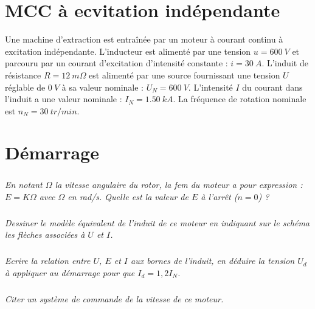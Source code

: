 \documentclass[10pt,fleqn]{article} %
\begin{document}

\vspace{4.5cm}
\pagestyle{fancy}
\thispagestyle{plain}


\def\columnseprulecolor{\color{ocre}}
\setlength{\columnseprule}{0.4pt} 

\ifprof
\begin{multicols}{2}
\else
\begin{multicols}{2}
\fi
\section*{MCC à ecvitation indépendante}


Une machine d'extraction est entraînée par un moteur à courant continu à excitation
indépendante.
L'inducteur est alimenté par une tension $u = \SI{600}{V}$ et parcouru par un courant d'excitation
d'intensité constante : $i = \SI{30}{A}$.
L'induit de résistance $R = \SI{12}{m \Omega}$ est alimenté par une source fournissant une tension $U$
réglable de $\SI{0}{V}$ à sa valeur nominale : $U_N = \SI{600}{V}$.
L'intensité $I$ du courant dans l'induit a une valeur nominale : $I_N = \SI{1,50}{kA}$.
La fréquence de rotation nominale est $n_N = \SI{30}{tr/min}$. 

\section*{Démarrage}

\subparagraph{}\textit{ En notant $\Omega$ la vitesse angulaire du rotor, la fem du moteur a pour expression : $E = K\Omega$ avec $\Omega$ en rad/s. Quelle est la valeur de $E$ à l'arrêt ($n = 0$) ? 
}
\ifprof
\begin{corrige}
\end{corrige}
\else
\fi

\subparagraph{}\textit{Dessiner le modèle équivalent de l'induit de ce moteur en indiquant sur le schéma les
flèches associées à $U$ et $I$.}
\ifprof
\begin{corrige}
\end{corrige}
\else
\fi
\subparagraph{}\textit{ Ecrire la relation entre $U$, $E$ et $I$ aux bornes de l'induit, en déduire la tension $U_d$ à
appliquer au démarrage pour que $I_d = 1,2 I_N$. }
\ifprof
\begin{corrige}
\end{corrige}
\else
\fi

\subparagraph{}\textit{Citer un système de commande de la vitesse de ce moteur. }
\ifprof
\begin{corrige}
\end{corrige}
\else
\fi


\end{multicols}
\end{multicols}
\end{document}
